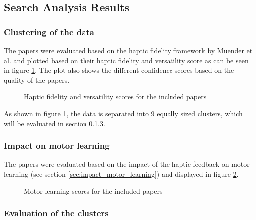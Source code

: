 \subsection{Search Analysis Results}

\subsubsection{Clustering of the data}
The papers were evaluated based on the haptic fidelity framework by Muender et al. \cite{Muender2022HapticReality} and plotted based on their haptic fidelity and versatility score as can be seen in figure \ref{fig:fidelity_plot}. The plot also shows the different confidence scores based on the quality of the papers. 

\begin{figure}[htbp]

\caption{Haptic fidelity and versatility scores for the included papers}
\label{fig:fidelity_plot}
\end{figure}

As shown in figure \ref{fig:fidelity_plot}, the data is separated into 9 equally sized clusters, which will be evaluated in section \ref{sec:evaluation_clusters}.


\subsubsection{Impact on motor learning}
The papers were evaluated based on the impact of the haptic feedback on motor learning (see section \ref{sec:impact_motor_learning}) and displayed in figure \ref{fig:motorlearning_plot}.

\begin{figure}[htbp]

\caption{Motor learning scores for the included papers}
\label{fig:motorlearning_plot}
\end{figure}



\subsubsection{Evaluation of the clusters}
\label{sec:evaluation_clusters}

